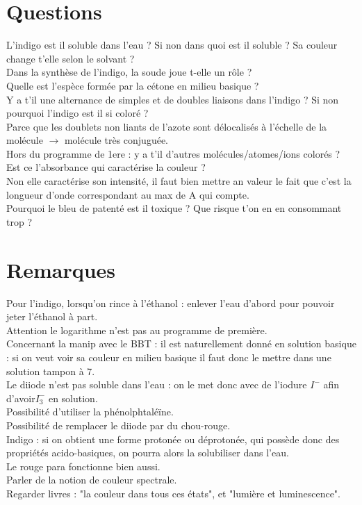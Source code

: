 \documentclass{article}
\begin{document}
\section*{Questions}
L'indigo est il soluble dans l'eau ? Si non dans quoi est il soluble ? Sa couleur change t'elle selon le solvant ?\\

Dans la synthèse de l'indigo, la soude joue t-elle un rôle ?\\

Quelle est l'espèce formée par la cétone en milieu basique ?\\

Y a t'il une alternance de simples et de doubles liaisons dans l'indigo ? Si non pourquoi l'indigo est il si coloré ?\\
Parce que les doublets non liants de l'azote sont délocalisés à l'échelle de la molécule $\rightarrow$ molécule très conjuguée.\\

Hors du programme de 1ere : y a t'il d'autres molécules/atomes/ions colorés ?\\

Est ce l'absorbance qui caractérise la couleur ?\\
Non elle caractérise son intensité, il faut bien mettre an valeur le fait que c'est la longueur d'onde correspondant au max de A qui compte.\\

Pourquoi le bleu de patenté est il toxique ? Que risque t'on en en consommant trop ?\\



\section*{Remarques}
Pour l'indigo, lorsqu'on rince à l'éthanol : enlever l'eau d'abord pour pouvoir jeter l'éthanol à part.\\
Attention le logarithme n'est pas au programme de première.\\
Concernant la manip avec le BBT : il est naturellement donné en solution basique : si on veut voir sa couleur en milieu basique il faut donc le mettre dans une solution tampon à 7.\\
Le diiode n'est pas soluble dans l'eau : on le met donc avec de l'iodure $I^-$ afin d'avoir$I_3^{-}$ en solution.\\
Possibilité d'utiliser la phénolphtaléïne.\\
Possibilité de remplacer le diiode par du chou-rouge.\\
Indigo : si on obtient une forme protonée ou déprotonée, qui possède donc des propriétés acido-basiques, on pourra alors la solubiliser dans l'eau.\\
Le rouge para fonctionne bien aussi.\\
Parler de la notion de couleur spectrale.\\
Regarder livres : "la couleur dans tous ces états", et "lumière et luminescence". \\



\end{document}
